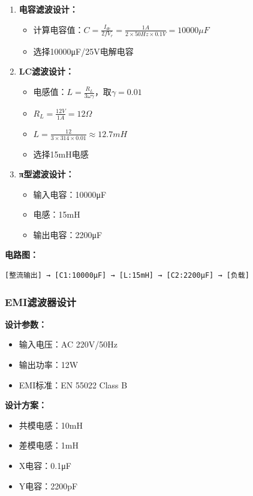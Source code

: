 \documentclass[12pt,UTF8]{ctexbook}
\begin{document}
\begin{enumerate}
    \item \textbf{电容滤波设计：}
    \begin{itemize}
        \item 计算电容值：$C = \frac{I_{dc}}{2fV_{r}} = \frac{1A}{2 \times 50Hz \times 0.1V} = 10000\mu F$
        \item 选择10000μF/25V电解电容
    \end{itemize}

    \item \textbf{LC滤波设计：}
    \begin{itemize}
        \item 电感值：$L = \frac{R_{L}}{3\omega \gamma}$，取$\gamma = 0.01$
        \item $R_{L} = \frac{12V}{1A} = 12\Omega$
        \item $L = \frac{12}{3 \times 314 \times 0.01} \approx 12.7mH$
        \item 选择15mH电感
    \end{itemize}

    \item \textbf{π型滤波设计：}
    \begin{itemize}
        \item 输入电容：10000μF
        \item 电感：15mH
        \item 输出电容：2200μF
    \end{itemize}
\end{enumerate}

\textbf{电路图：}

\begin{verbatim}
[整流输出] → [C1:10000μF] → [L:15mH] → [C2:2200μF] → [负载]
\end{verbatim}

\subsubsection{EMI滤波器设计}

\textbf{设计参数：}
\begin{itemize}
    \item 输入电压：AC 220V/50Hz
    \item 输出功率：12W
    \item EMI标准：EN 55022 Class B
\end{itemize}

\textbf{设计方案：}
\begin{itemize}
    \item 共模电感：10mH
    \item 差模电感：1mH
    \item X电容：0.1μF
    \item Y电容：2200pF
\end{itemize}
\end{document}
